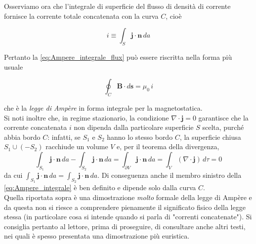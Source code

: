 Osserviamo ora che l'integrale di superficie del flusso di densità di corrente fornisce la corrente totale concatenata con la curva $C$, cioè

\begin{equation}\label{eq:def_Iconc}
    i \equiv \int_S \mathbf j \cdot \mathbf n\, d a
\end{equation}

Pertanto la \ref{eq:Ampere_integrale_flux} può essere riscritta nella forma più usuale

\begin{tcolorbox}[colback=yellow!10!white, colframe=orange!70!black, boxrule=0.8pt]
\begin{equation}\label{eq:Ampere_integrale}
    \oint_C \mathbf B \cdot d\mathbf{s} = \mu_0\, i
\end{equation}
\end{tcolorbox}

che è la \emph{legge di Ampère} in forma integrale per la magnetostatica.\\

Si noti inoltre che, in regime stazionario, la condizione $\nabla\cdot \mathbf j = 0$ garantisce che la corrente concatenata $i$ non dipenda dalla particolare superficie $S$ scelta, purché abbia bordo $C$: infatti, se $S_1$ e $S_2$ hanno lo stesso bordo $C$, la superficie chiusa $S_1\cup (-S_2)$ racchiude un volume $V$ e, per il teorema della divergenza,
\[
\int_{S_1}\mathbf j\cdot \mathbf n\,da-\int_{S_2}\mathbf j\cdot \mathbf n\,da
=
\int_{\partial V}\mathbf j\cdot \mathbf n\,da
=
\int_V (\nabla\cdot \mathbf j)\,d\tau
=0
\]
da cui $\int_{S_1}\mathbf j\cdot \mathbf n\,da=\int_{S_2}\mathbf j\cdot \mathbf n\,da$.
Di conseguenza anche il membro sinistro della \ref{eq:Ampere_integrale} è ben definito e dipende solo dalla curva $C$.\\

Quella riportata sopra è una dimostrazione \emph{molto} formale della legge di Ampère e da questa non si riesce a comprendere pienamente il significato fisico della legge stessa (in particolare cosa si intende quando si parla di "correnti concatenate"). Si consiglia pertanto al lettore, prima di proseguire, di consultare anche altri testi, nei quali è spesso presentata una dimostrazione più euristica.

